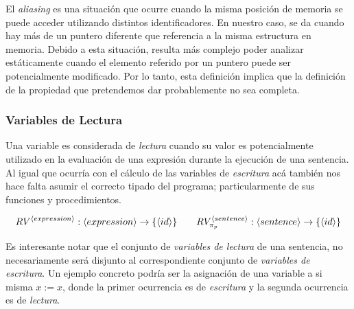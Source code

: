 El \textit{aliasing} es una situación que ocurre cuando la misma posición de memoria se puede acceder utilizando distintos identificadores.
En nuestro caso, se da cuando hay más de un puntero diferente que referencia a la misma estructura en memoria.
Debido a esta situación, resulta más complejo poder analizar estáticamente cuando el elemento referido por un puntero puede ser potencialmente modificado. Por lo tanto, esta definición implica que la definición de la propiedad que
pretendemos dar probablemente no sea completa.

\subsubsection{Variables de Lectura}

Una variable es considerada de \textit{lectura} cuando su valor es potencialmente utilizado en la evaluación de una expresión durante la ejecución de una sentencia. Al igual que ocurría con el cálculo de las variables de \textit{escritura} acá también nos hace falta asumir el correcto tipado del programa; particularmente de sus funciones y procedimientos.

\begin{gather*}
RV^{\langle expression \rangle}: \langle expression \rangle \rightarrow \{ \langle id \rangle \}
\qquad
RV^{\langle sentence \rangle}_{\pi_{p}}: \langle sentence \rangle \rightarrow \{ \langle id \rangle \}
\end{gather*}

Es interesante notar que el conjunto de \textit{variables de lectura} de una sentencia, no necesariamente será disjunto al correspondiente conjunto de \textit{variables de escritura}.
Un ejemplo concreto podría ser la asignación de una variable a si misma $x := x$, donde la primer ocurrencia es de \textit{escritura} y la segunda ocurrencia es de \textit{lectura}.

